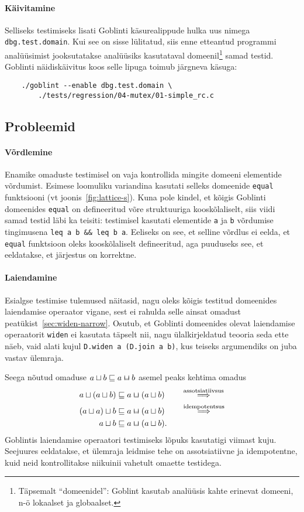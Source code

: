 \documentclass[../thesis.tex]{subfiles}
\begin{document}
\paragraph{Käivitamine}
Selliseks testimiseks lisati Goblinti käsurealippude hulka uus nimega \texttt{dbg.test.domain}. Kui see on sisse lülitatud, siis enne etteantud programmi analüüsimist jooksutatakse analüüsiks kasutataval domeenil\footnote{Täpsemalt \enquote{domeenidel}: Goblint kasutab analüüsis kahte erinevat domeeni, n-ö lokaalset ja globaalset.} samad testid. Goblinti näidiskäivitus koos selle lipuga toimub järgneva käsuga:
\begin{verbatim}
	./goblint --enable dbg.test.domain \
	    ./tests/regression/04-mutex/01-simple_rc.c
\end{verbatim}

\subsection{Probleemid}
\paragraph{Võrdlemine}
Enamike omaduste testimisel on vaja kontrollida mingite domeeni elementide võrdumist. Esimese loomuliku variandina kasutati selleks domeenide \texttt{equal} funktsiooni (vt joonis~\ref{fig:lattice-s}). Kuna pole kindel, et kõigis Goblinti domeenides \texttt{equal} on defineeritud võre struktuuriga kooskõlaliselt, siis viidi samad testid läbi ka teisiti: testimisel kasutati elementide \texttt{a} ja \texttt{b} võrdumise tingimusena \texttt{leq a b \&\& leq b a}. Eeliseks on see, et selline võrdlus ei eelda, et \texttt{equal} funktsioon oleks kooskõlaliselt defineeritud, aga puuduseks see, et eeldatakse, et järjestus on korrektne.

\paragraph{Laiendamine}
Esialgse testimise tulemused näitasid, nagu oleks kõigis testitud domeenides laiendamise operaator vigane, sest ei rahulda selle ainsat omadust peatükist~\ref{sec:widen-narrow}. Osutub, et Goblinti domeenides olevat laiendamise operaatorit \texttt{widen} ei kasutata täpselt nii, nagu ülalkirjeldatud teooria seda ette näeb, vaid alati kujul \texttt{D.widen a (D.join a b)}, kus teiseks argumendiks on juba vastav ülemraja.

Seega nõutud omaduse $a \sqcup b \sqleq a \widen b$ asemel peaks kehtima omadus
\begin{align*}
	a \sqcup (a \sqcup b) &\sqleq a \widen (a \sqcup b) \qquad\stackrel{\text{assotsiatiivsus}}{\Longrightarrow} \\
	(a \sqcup a) \sqcup b &\sqleq a \widen (a \sqcup b) \qquad\stackrel{\text{idempotentsus}}{\Longrightarrow} \\
	a \sqcup b &\sqleq a \widen (a \sqcup b).
\end{align*}
Goblintis laiendamise operaatori testimiseks lõpuks kasutatigi viimast kuju. Seejuures eeldatakse, et ülemraja leidmise tehe on assotsiatiivne ja idempotentne, kuid neid kontrollitakse niikuinii vahetult omaette testidega.
\end{document}
